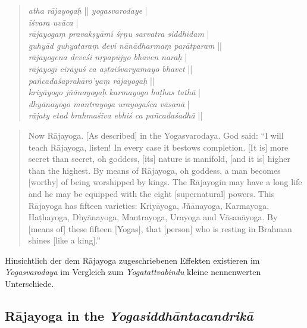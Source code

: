 \begin{quote}
\textit{atha rājayogaḥ} || \textit{yogasvarodaye} |\\
\textit{īśvara uvāca} |\\
\textit{rājayogaṃ pravakṣyāmi śṛṇu sarvatra siddhidam} |\\
\textit{guhyād guhyataraṃ devi nānādharmaṃ parātparam} ||\\
\textit{rājayogena deveśi nṛpapūjyo bhaven naraḥ} |\\
\textit{rājayogī cirāyuś ca aṣṭaiśvaryamayo bhavet} ||\\
\textit{pañcadaśaprakāro'yaṃ rājayogaḥ} ||\\
\textit{kriyāyogo jñānayogaḥ karmayogo haṭhas tathā} |\\
\textit{dhyānayogo mantrayoga urayogaśca vāsanā} |\\
\textit{rājaty etad brahmaśīva ebhiś ca pañcadaśadhā} ||\\
\end{quote}

\begin{quote}
Now Rājayoga. [As described] in the Yogasvarodaya.
God said:
``I will teach Rājayoga, listen! In every case it bestows completion.
[It is] more secret than secret, oh goddess, [its] nature is manifold, [and it is] higher than the highest. 
By means of Rājayoga, oh goddess, a man becomes [worthy] of being worshipped by kings.
The Rājayogin may have a long life and he may be equipped with the eight [supernatural] powers.
This Rājayoga has fifteen varieties: Kriyāyoga, Jñānayoga, Karmayoga, Haṭhayoga,
Dhyānayoga, Mantrayoga, Urayoga and Vāsanāyoga.
By [means of] these fifteen [Yogas], that [person] who is resting in Brahman shines [like a king].''
\end{quote}

Hinsichtlich der dem Rājayoga zugeschriebenen Effekten existieren im \emph{Yogasvarodaya} im Vergleich zum \emph{Yogatattvabindu} kleine nennenwerten Unterschiede.  

\subsection{Rājayoga in the \emph{Yogasiddhāntacandrikā}}


